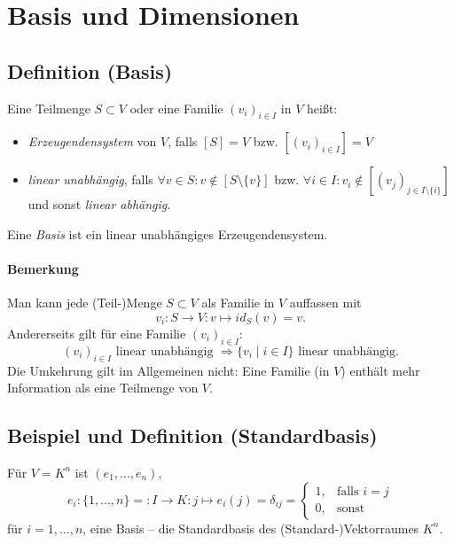 \section{Basis und Dimensionen}

\subsection{Definition (Basis)}
	\begin{Definition}[Basis]
		Eine Teilmenge $S\subset V$ oder eine Familie $(v_i)_{i\in I}$ in $ V $ heißt:
	\begin{itemize}
		\item \emph{Erzeugendensystem} von $ V $, falls $[S] = V$ bzw. $[(v_i)_{i\in I}] = V$
		\item \emph{linear unabhängig}, falls $\forall v\in S: v \notin [S\setminus\{{v\}}]$ bzw. $\forall i\in I: v_i \notin [(v_j)_{j\in I\setminus\{{i\}}}]$ und sonst \emph{linear abhängig}.
	\end{itemize}
        Eine \emph{Basis} ist ein linear unabhängiges Erzeugendensystem.
	\end{Definition}

\paragraph{Bemerkung}
	Man kann jede (Teil-)Menge $S\subset V$ als Familie in $V$ auffassen mit
		\[v_i: S \to V: v\mapsto id_S(v) = v.\]
	Andererseits gilt für eine Familie $(v_i)_{i\in I} $:
		\[(v_i)_{i\in I} \text{ linear unabhängig } \Rightarrow \{v_i \mid i\in I\} \text{ linear unabhängig.}\]
	Die Umkehrung gilt im Allgemeinen nicht: Eine Familie (in $ V $) enthält mehr Information als eine Teilmenge von $ V $.
	
\subsection{Beispiel und Definition (Standardbasis)}
	\begin{Definition}[Standardbasis]
		Für $V = K^n$ ist $(e_1, ... , e_n)$,
	\begin{equation*}
		e_i:\{{1, ... ,n\}} =: I\to K: j\mapsto e_i(j)= \delta_{ij}=
		\begin{cases}
			1,& \text{falls } i=j\\
			0,& \text{sonst}
		\end{cases}
	\end{equation*}
	für $i=1,\dots,n$, eine Basis -- die Standardbasis des (Standard-)Vektorraumes $K^n$.
	\end{Definition}

